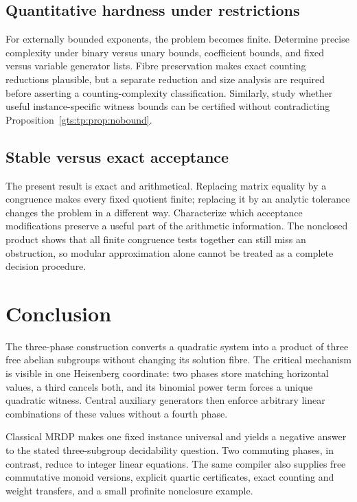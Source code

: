 \documentclass[11pt,letterpaper]{article}
\theoremstyle{definition}
\theoremstyle{remark}
\begin{document}
\subsection{Quantitative hardness under restrictions}\label{gts:tp:q:hardness}
For externally bounded exponents, the problem becomes finite. Determine
precise complexity under binary versus unary bounds, coefficient bounds,
and fixed versus variable generator lists. Fibre preservation makes exact
counting reductions plausible, but a separate reduction and size analysis
are required before asserting a counting-complexity classification.
Similarly, study whether useful instance-specific witness bounds can be
certified without contradicting Proposition~\ref{gts:tp:prop:nobound}.

\subsection{Stable versus exact acceptance}\label{gts:tp:q:stable}
The present result is exact and arithmetical. Replacing matrix equality by a
congruence makes every fixed quotient finite; replacing it by an analytic
tolerance changes the problem in a different way. Characterize which
acceptance modifications preserve a useful part of the arithmetic
information. The nonclosed product shows that all finite congruence tests
together can still miss an obstruction, so modular approximation alone
cannot be treated as a complete decision procedure.

\section{Conclusion}

The three-phase construction converts a quadratic system into a product of
three free abelian subgroups without changing its solution fibre. The
critical mechanism is visible in one Heisenberg coordinate: two phases
store matching horizontal values, a third cancels both, and its binomial
power term forces a unique quadratic witness. Central auxiliary generators
then enforce arbitrary linear combinations of these values without a
fourth phase.

Classical MRDP makes one fixed instance universal and yields a negative
answer to the stated three-subgroup decidability question. Two commuting
phases, in contrast, reduce to integer linear equations. The same compiler
also supplies free commutative monoid versions, explicit quartic
certificates, exact counting and weight transfers, and a small profinite
nonclosure example.
\end{document}
